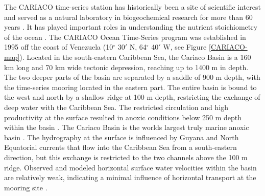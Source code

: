 The CARIACO time-series station has historically been a site of scientific interest and served as a natural laboratory in biogeochemical research for more than 60 years \citep{Muller-Karger2019a}. It has played important roles in understanding the nutrient stoichiometry of the ocean \citep{Redfield1963}. The CARIACO Ocean Time-Series program was established in 1995 off the coast of Venezuela (10$^\circ$ 30$'$ N, 64$^\circ$ 40$'$ W, see Figure \ref{CARIACO-map}). Located in the south-eastern Caribbean Sea, the Cariaco Basin is a 160 km long and 70 km wide tectonic depression, reaching up to 1400 m in depth. The two deeper parts of the basin are separated by a saddle of 900 m depth, with the time-series mooring located in the eastern part. The entire basin is bound to the west and north by a shallow ridge at 100 m depth, restricting the exchange of deep water with the Caribbean Sea. The restricted circulation and high productivity at the surface resulted in anoxic conditions below 250 m depth within the basin \citep{Richards1956}. The Cariaco Basin is the worlds largest truly marine anoxic basin \citep{Wakeham2012}. The hydrography at the surface is influenced by Guyana and North Equatorial currents that flow into the Caribbean Sea from a south-eastern direction, but this exchange is restricted to the two channels above the 100 m ridge. Observed and modeled horizontal surface water velocities within the basin are relatively weak, indicating a minimal influence of horizontal transport at the mooring site \citep{Alvera-Azcarate2009}. 

